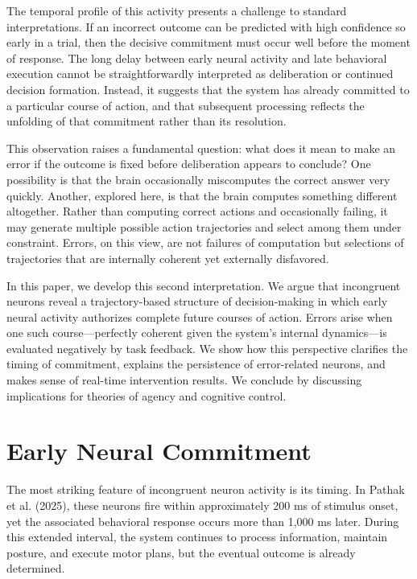 \documentclass[11pt]{article}
\begin{document}
The temporal profile of this activity presents a challenge to standard interpretations. If an incorrect outcome can be predicted with high confidence so early in a trial, then the decisive commitment must occur well before the moment of response. The long delay between early neural activity and late behavioral execution cannot be straightforwardly interpreted as deliberation or continued decision formation. Instead, it suggests that the system has already committed to a particular course of action, and that subsequent processing reflects the unfolding of that commitment rather than its resolution.

This observation raises a fundamental question: what does it mean to make an error if the outcome is fixed before deliberation appears to conclude? One possibility is that the brain occasionally miscomputes the correct answer very quickly. Another, explored here, is that the brain computes something different altogether. Rather than computing correct actions and occasionally failing, it may generate multiple possible action trajectories and select among them under constraint. Errors, on this view, are not failures of computation but selections of trajectories that are internally coherent yet externally disfavored.

In this paper, we develop this second interpretation. We argue that incongruent neurons reveal a trajectory-based structure of decision-making in which early neural activity authorizes complete future courses of action. Errors arise when one such course—perfectly coherent given the system’s internal dynamics—is evaluated negatively by task feedback. We show how this perspective clarifies the timing of commitment, explains the persistence of error-related neurons, and makes sense of real-time intervention results. We conclude by discussing implications for theories of agency and cognitive control.

\section{Early Neural Commitment}

The most striking feature of incongruent neuron activity is its timing. In Pathak et al. (2025), these neurons fire within approximately 200 ms of stimulus onset, yet the associated behavioral response occurs more than 1,000 ms later. During this extended interval, the system continues to process information, maintain posture, and execute motor plans, but the eventual outcome is already determined.
\end{document}
